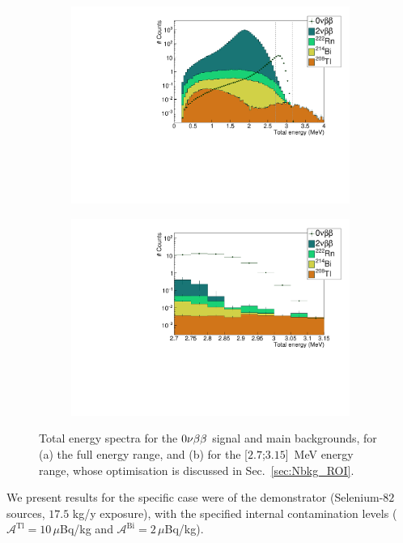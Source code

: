 \begin{figure}[h]
\centering
\begin{subfigure}[t]{0.7\textwidth}
  \centering
  \includegraphics[width=1.1\textwidth]{Sensitivity/fig_sensitivity/energy_spectrum_with_B_82Se.pdf}
  \captionsetup{justification=centering}
  \caption{
    \label{subfig:energy_spectra_full}}
\end{subfigure}
\hfill
\begin{subfigure}[t]{0.7\textwidth}
  \centering
  \includegraphics[width=1.1\textwidth]{Sensitivity/fig_sensitivity/energy_spectrum_with_B_82Se_zoom.pdf}
  \captionsetup{justification=centering}
  \caption{
    \label{subfig:energy_spectra_zoom}}
\end{subfigure}
\caption{Total energy spectra for the $0\nu\beta\beta$ signal and main backgrounds, for (a) the full energy range, and (b) for the [$2.7$;$3.15$]~MeV energy range, whose optimisation is discussed in Sec.~\ref{sec:Nbkg_ROI}.
  \label{fig:energy_spectra}}
\end{figure}
We present results for the specific case were of the demonstrator (Selenium-$82$ sources, $17.5$ kg/y exposure), with the specified internal contamination levels ($\mathcal{A}^{\text{Tl}} = 10\,\mu$Bq/kg and $\mathcal{A}^{\text{Bi}} = 2\,\mu$Bq/kg).


